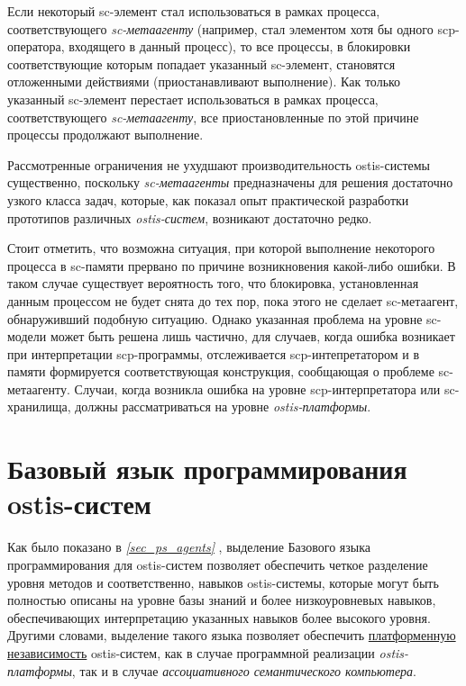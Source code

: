 Если некоторый sc-элемент стал использоваться в рамках процесса, соответствующего \textit{sc-метаагенту} (например, стал элементом хотя бы одного scp-оператора, входящего в данный процесс), то все процессы, в блокировки соответствующие которым попадает указанный sc-элемент, становятся отложенными действиями (приостанавливают выполнение). Как только указанный sc-элемент перестает использоваться в рамках процесса, соответствующего \textit{sc-метаагенту}, все приостановленные по этой причине процессы продолжают выполнение.

Рассмотренные ограничения не ухудшают производительность ostis-системы существенно, поскольку \textit{sc-мета\-аген\-ты} предназначены для решения достаточно узкого класса задач, которые, как показал опыт практической разработки прототипов различных \textit{ostis-систем}, возникают достаточно редко.
	
Стоит отметить, что возможна ситуация, при которой выполнение некоторого процесса в sc-памяти прервано по причине возникновения какой-либо ошибки. В таком случае существует вероятность того, что блокировка, установленная данным процессом не будет снята до тех пор, пока этого не сделает sc-метаагент, обнаруживший подобную ситуацию. Однако указанная проблема на уровне sc-модели может быть решена лишь частично, для случаев, когда ошибка возникает при интерпретации scp-программы, отслеживается scp-интепретатором и в памяти формируется соответствующая конструкция, сообщающая о проблеме sc-метаагенту. Случаи, когда возникла ошибка на уровне scp-интерпретатора или sc-хранилища, должны рассматриваться на уровне \textit{ostis-платформы}.

\section{Базовый язык программирования ostis-систем}
\label{sec_ps_scp}

Как было показано в \textit{\ref{sec_ps_agents} }, выделение Базового языка программирования для ostis-систем позволяет обеспечить четкое разделение уровня методов и соответственно, навыков ostis-системы, которые могут быть полностью описаны на уровне базы знаний и более низкоуровневых навыков, обеспечивающих интерпретацию указанных навыков более высокого уровня. Другими словами, выделение такого языка позволяет обеспечить \uline{платформенную независимость} ostis-систем, как в случае программной реализации \textit{ostis-платформы}, так и в случае \textit{ассоциативного семантического компьютера}.

